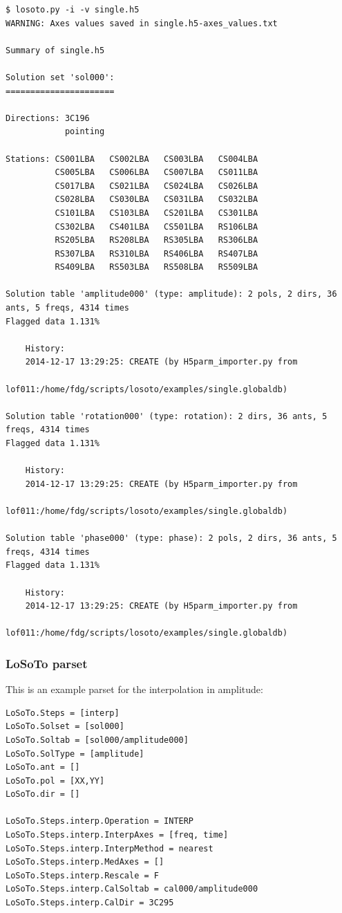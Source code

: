 \documentclass[]{article}
\begin{document}
\begin{verbatim}
$ losoto.py -i -v single.h5
WARNING: Axes values saved in single.h5-axes_values.txt

Summary of single.h5

Solution set 'sol000':
======================

Directions: 3C196
            pointing
            
Stations: CS001LBA   CS002LBA   CS003LBA   CS004LBA  
          CS005LBA   CS006LBA   CS007LBA   CS011LBA  
          CS017LBA   CS021LBA   CS024LBA   CS026LBA  
          CS028LBA   CS030LBA   CS031LBA   CS032LBA  
          CS101LBA   CS103LBA   CS201LBA   CS301LBA  
          CS302LBA   CS401LBA   CS501LBA   RS106LBA  
          RS205LBA   RS208LBA   RS305LBA   RS306LBA  
          RS307LBA   RS310LBA   RS406LBA   RS407LBA  
          RS409LBA   RS503LBA   RS508LBA   RS509LBA  
          
Solution table 'amplitude000' (type: amplitude): 2 pols, 2 dirs, 36 ants, 5 freqs, 4314 times
Flagged data 1.131%

    History:
    2014-12-17 13:29:25: CREATE (by H5parm_importer.py from
                         lof011:/home/fdg/scripts/losoto/examples/single.globaldb)

Solution table 'rotation000' (type: rotation): 2 dirs, 36 ants, 5 freqs, 4314 times
Flagged data 1.131%

    History:
    2014-12-17 13:29:25: CREATE (by H5parm_importer.py from
                         lof011:/home/fdg/scripts/losoto/examples/single.globaldb)

Solution table 'phase000' (type: phase): 2 pols, 2 dirs, 36 ants, 5 freqs, 4314 times
Flagged data 1.131%

    History:
    2014-12-17 13:29:25: CREATE (by H5parm_importer.py from
                         lof011:/home/fdg/scripts/losoto/examples/single.globaldb)
\end{verbatim}

\subsubsection{LoSoTo parset}
\label{losoto:parset}

This is an example parset for the interpolation in amplitude:
\begin{verbatim}
LoSoTo.Steps = [interp]
LoSoTo.Solset = [sol000]
LoSoTo.Soltab = [sol000/amplitude000]
LoSoTo.SolType = [amplitude]
LoSoTo.ant = []
LoSoTo.pol = [XX,YY]
LoSoTo.dir = []

LoSoTo.Steps.interp.Operation = INTERP
LoSoTo.Steps.interp.InterpAxes = [freq, time]
LoSoTo.Steps.interp.InterpMethod = nearest
LoSoTo.Steps.interp.MedAxes = []
LoSoTo.Steps.interp.Rescale = F
LoSoTo.Steps.interp.CalSoltab = cal000/amplitude000
LoSoTo.Steps.interp.CalDir = 3C295
\end{verbatim}
\end{document}
